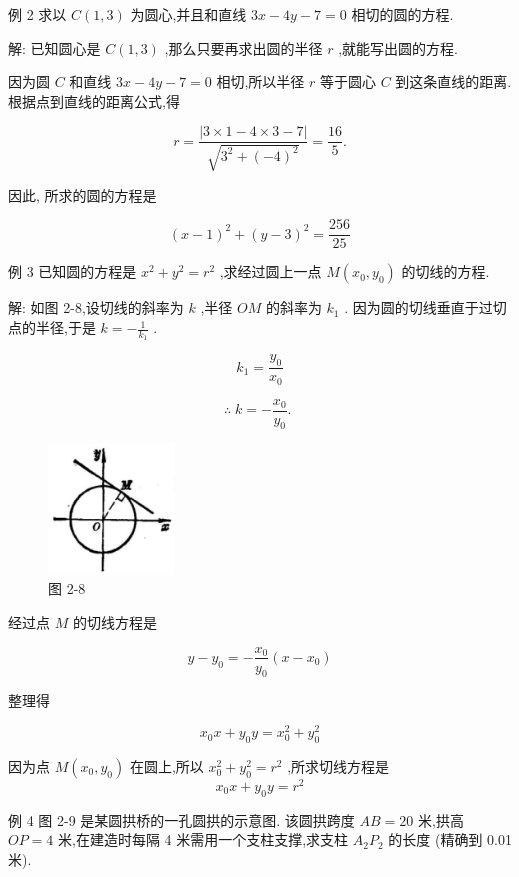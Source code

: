 \documentclass[lang=cn,newtx,10.5pt,scheme=chinese]{elegantbook}
\begin{document}
例 2 求以 \(C\left( {1,3}\right)\) 为圆心,并且和直线 \({3x} - {4y} - 7 = 0\) 相切的圆的方程.

解: 已知圆心是 \(C\left( {1,3}\right)\) ,那么只要再求出圆的半径 \(r\) ,就能写出圆的方程.

因为圆 \(C\) 和直线 \({3x} - {4y} - 7 = 0\) 相切,所以半径 \(r\) 等于圆心 \(C\) 到这条直线的距离. 根据点到直线的距离公式,得

\[
  r = \frac{\left| 3 \times 1 - 4 \times 3 - 7\right| }{\sqrt{{3}^{2} + {\left( -4\right) }^{2}}} = \frac{16}{5}.
\]

因此, 所求的圆的方程是

\[
    {\left( x - 1\right) }^{2} + {\left( y - 3\right) }^{2} = \frac{256}{25}
\]

例 3 已知圆的方程是 \({x}^{2} + {y}^{2} = {r}^{2}\) ,求经过圆上一点 \(M\left( {{x}_{0},{y}_{0}}\right)\) 的切线的方程.

解: 如图 2-8,设切线的斜率为 \(k\) ,半径 \({OM}\) 的斜率为 \({k}_{1}\) . 因为圆的切线垂直于过切点的半径,于是 \(k = - \frac{1}{{k}_{1}}\) .

\[
    {k}_{1} = \frac{{y}_{0}}{{x}_{0}}
\]

\[
  \therefore \;k = - \frac{{x}_{0}}{{y}_{0}}\text{. }
\]

\begin{figure}[h]
  \centering
  \includegraphics[max width=0.3\textwidth]{images/01912cc2-ffb6-728e-9ae7-b113ff05c64b_79_916236.jpg}
  \caption{图 2-8}
\end{figure}



经过点 \(M\) 的切线方程是

\[
  y - {y}_{0} = - \frac{{x}_{0}}{{y}_{0}}\left( {x - {x}_{0}}\right)
\]

整理得

\[
    {x}_{0}x + {y}_{0}y = {x}_{0}^{2} + {y}_{0}^{2}
\]
\begin{corollary}[切线方程]
	
因为点 \(M\left( {{x}_{0},{y}_{0}}\right)\) 在圆上,所以 \({x}_{0}^{2} + {y}_{0}^{2} = {r}^{2}\) ,所求切线方程是
\[
    {x}_{0}x + {y}_{0}y = {r}^{2}
\]
\end{corollary}
例 4 图 2-9 是某圆拱桥的一孔圆拱的示意图. 该圆拱跨度 \({AB} = {20}\) 米,拱高 \({OP} = 4\) 米,在建造时每隔 4 米需用一个支柱支撑,求支柱 \({A}_{2}{P}_{2}\) 的长度 (精确到 0.01 米).
\end{document}
